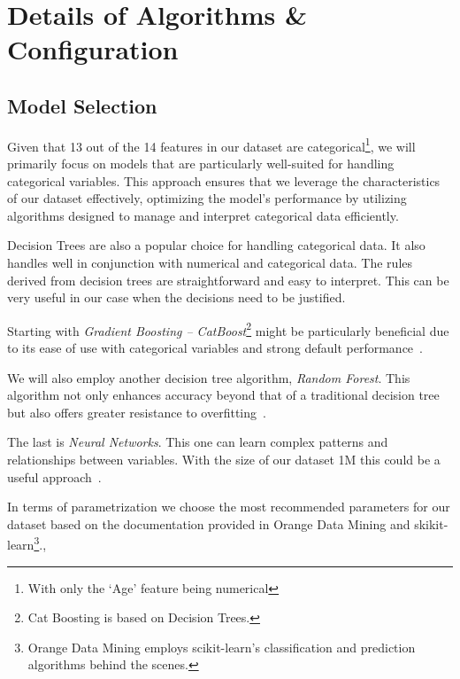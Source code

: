 \section{Details of Algorithms \& Configuration}

\subsection{Model Selection}

Given that 13 out of the 14 features in our dataset are categorical\footnote{With
only the `Age' feature being numerical}, we will primarily focus on models that are 
particularly well-suited for handling categorical variables. This approach ensures
that we leverage the characteristics of our dataset effectively, optimizing the 
model's performance by utilizing algorithms designed to manage and interpret 
categorical data efficiently.

Decision Trees are also a popular choice for handling categorical data.
It also handles well in conjunction with numerical and categorical data.
The rules derived from decision trees are straightforward and easy to interpret.
This can be very useful in our case when the decisions need to be justified.

Starting with \emph{Gradient Boosting -- CatBoost}\footnote{Cat Boosting
 is based on Decision Trees.} 
might be particularly
beneficial due to its ease of use with categorical variables and 
strong default performance~\parencite[]{2024:yandex}. 

We will also employ another decision tree algorithm, \emph{Random Forest}. This 
algorithm not only enhances accuracy beyond that of a traditional decision 
tree but also offers greater resistance to overfitting~\parencite[]{2024:ibm-rf}.

The last is \emph{Neural Networks}. This one can learn complex patterns and 
relationships between variables. With the size of our dataset 1M this could
be a useful approach~\parencite[]{2024:ibm-nn}.

In terms of parametrization we choose the most recommended parameters for our
dataset based on the documentation provided in Orange Data Mining and 
skikit-learn\footnote{Orange Data Mining employs scikit-learn's classification and prediction algorithms behind the scenes.}.,

